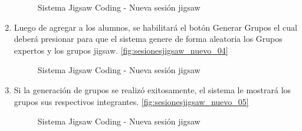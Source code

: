 \begin{enumerate}
\begin{figure}[h!]
	\centering
	\caption{Sistema Jigsaw Coding - Nueva sesión jigsaw}
	\label{fig:sesionesjigsaw_nuevo_03}
	\end{figure}
	\item Luego de agregar a los alumnos, se habilitará el botón Generar Grupos el cual deberá presionar para que el sistema genere de forma aleatoria los Grupos expertos y los grupos jigsaw. \autoref{fig:sesionesjigsaw_nuevo_04}
	\begin{figure}[h!]
		\centering
		\caption{Sistema Jigsaw Coding - Nueva sesión jigsaw}
		\label{fig:sesionesjigsaw_nuevo_04}
	\end{figure}
	\item Si la generación de grupos se realizó exitosamente, el sistema le mostrará los grupos sus respectivos integrantes. \autoref{fig:sesionesjigsaw_nuevo_05}
	\begin{figure}[h!]
		\centering
		\caption{Sistema Jigsaw Coding - Nueva sesión jigsaw}
		\label{fig:sesionesjigsaw_nuevo_05}

\end{figure}
\end{enumerate}
